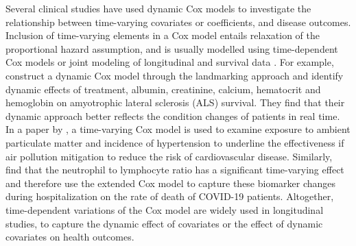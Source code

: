 Several clinical studies have used dynamic Cox models to investigate the relationship between time-varying covariates or coefficients, and disease outcomes. Inclusion of time-varying elements in a Cox model entails relaxation of the proportional hazard assumption, and is usually modelled using time-dependent Cox models or joint modeling of longitudinal and survival data \citep{zhang2018time}. For example, \cite{huang2023dynamic} construct a dynamic Cox model through the landmarking approach and identify dynamic effects of treatment, albumin, creatinine, calcium, hematocrit and hemoglobin on amyotrophic lateral sclerosis (ALS) survival. They find that their dynamic approach better reflects the  condition changes of patients in real time. In a paper by \cite{bo2019dynamic}, a time-varying Cox model is used to examine exposure to ambient particulate matter and incidence of hypertension to underline the effectiveness if air pollution mitigation to reduce the risk of cardiovascular disease. Similarly, \cite{geraili2022evaluation} find that the neutrophil to lymphocyte ratio has a significant time-varying effect and therefore use the extended Cox model to capture these biomarker changes during hospitalization on the rate of death of COVID-19 patients.
Altogether, time-dependent variations of the Cox model are widely used in longitudinal studies, to capture the dynamic effect of covariates or the effect of dynamic covariates on health outcomes.

